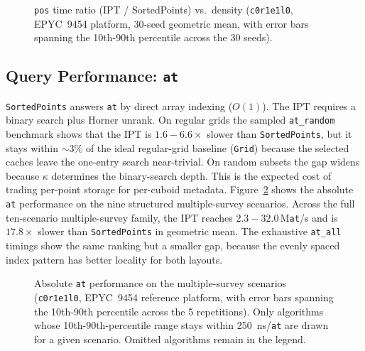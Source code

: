 \documentclass[manuscript,screen,review]{acmart}
\theoremstyle{definition}
\theoremstyle{plain}
\begin{document}
\begin{figure}
\centering

\caption{\texttt{pos} time ratio (IPT / SortedPoints) vs.\ density
  (\texttt{c0r1e1l0}, EPYC~9454 platform, 30-seed geometric mean, with
  error bars spanning the 10th-90th percentile across the 30 seeds).}
\label{figure:pos-ratio}
\end{figure}

\subsection{Query Performance: \texttt{at}}
\label{section:results-at}

\texttt{SortedPoints} answers \texttt{at} by direct array indexing
($O(1)$). The IPT requires a binary search plus Horner unrank.
On regular grids the sampled \texttt{at\_random} benchmark shows that
the IPT is $1.6{-}6.6\times$ slower than
\texttt{SortedPoints}, but it stays within ${\sim}3\%$ of the ideal
regular-grid baseline (\texttt{Grid}) because the selected caches
leave the one-entry search near-trivial.
On random subsets the gap widens because $\kappa$ determines the
binary-search depth.
This is the expected cost of trading per-point storage for
per-cuboid metadata.
Figure~\ref{figure:at-multi-survey} shows the absolute \texttt{at}
performance on the nine structured multiple-survey scenarios.
Across the full ten-scenario multiple-survey family, the IPT reaches
$2.3{-}32.0$\,M\texttt{at}/s and is $17.8\times$ slower than
\texttt{SortedPoints} in geometric mean.
The exhaustive \texttt{at\_all} timings show the same ranking but a
smaller gap, because the evenly spaced index pattern has
better locality for both layouts.

\begin{figure}
\centering
\resizebox{0.96\linewidth}{!}{}
\caption{Absolute \texttt{at} performance on the multiple-survey
  scenarios (\texttt{c0r1e1l0}, EPYC~9454 reference platform, with
  error bars spanning the 10th-90th percentile across the 5
  repetitions). Only algorithms whose 10th-90th-percentile range
  stays within 250~ns/\texttt{at} are drawn for a given scenario.
  Omitted algorithms remain in the legend.}
\label{figure:at-multi-survey}
\end{figure}
\end{document}

